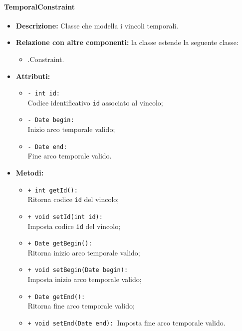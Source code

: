 \paragraph{TemporalConstraint}
\label{bottemporalconstraint}
\begin{flushleft}
\begin{itemize}
\item \textbf{Descrizione:} Classe che modella i vincoli temporali.
\item \textbf{Relazione con altre componenti:} la classe estende la seguente classe:
		\begin{itemize}
			\item \smodel{}.Constraint.
		\end{itemize}
\item \textbf{Attributi:}
\begin{sloppypar}
\begin{itemize}
\item \texttt{- int id:}\\ Codice identificativo \texttt{id} associato al vincolo;
\item \texttt{- Date begin:}\\ Inizio arco temporale valido;
\item \texttt{- Date end:}\\ Fine arco temporale valido.
\end{itemize}
\end{sloppypar}
\item \textbf{Metodi:}
\begin{sloppypar}
\begin{itemize}
\item \texttt{+ int getId():}\\ Ritorna codice \texttt{id} del vincolo;
\item \texttt{+ void setId(int id):}\\ Imposta codice \texttt{id} del vincolo;
\item \texttt{+ Date getBegin():}\\ Ritorna inizio arco temporale valido;
\item \texttt{+ void setBegin(Date begin):}\\ Imposta inizio arco temporale valido;
\item \texttt{+ Date getEnd():}\\ Ritorna fine arco temporale valido;
\item \texttt{+ void setEnd(Date end):}\ Imposta fine arco temporale valido.
\end{itemize}
\end{sloppypar}
\end{itemize}
\end{flushleft}


